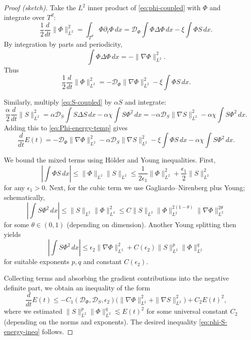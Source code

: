 \documentclass[12pt]{article}
\theoremstyle{plain}
\theoremstyle{definition}
\theoremstyle{remark}
\begin{document}
\begin{proof}[Proof (sketch)]
Take the $L^2$ inner product of \eqref{eq:phi-coupled} with $\Phi$ and integrate
over $T^d$:
\[
    \frac12 \frac{d}{dt}\|\Phi\|_{L^2}^2
    = \int_{T^d} \Phi \partial_t \Phi\,dx
    = \mathcal{D}_\Phi \int \Phi \Delta \Phi\,dx
      - \xi \int \Phi S\,dx.
\]
By integration by parts and periodicity,
\[
    \int \Phi \Delta \Phi\,dx
    = -\|\nabla\Phi\|_{L^2}^2.
\]
Thus
\begin{equation}
    \frac12 \frac{d}{dt}\|\Phi\|_{L^2}^2
    = - \mathcal{D}_\Phi \|\nabla\Phi\|_{L^2}^2
      - \xi \int \Phi S\,dx.
    \label{eq:Phi-energy-temp}
\end{equation}

Similarly, multiply \eqref{eq:S-coupled} by $\alpha S$ and integrate:
\[
    \frac{\alpha}{2} \frac{d}{dt}\|S\|_{L^2}^2
    = \alpha \mathcal{D}_S \int S \Delta S\,dx
      - \alpha\chi \int S \Phi^2\,dx
    = - \alpha \mathcal{D}_S \|\nabla S\|_{L^2}^2
      - \alpha\chi \int S \Phi^2\,dx.
\]
Adding this to \eqref{eq:Phi-energy-temp} gives
\[
    \frac{d}{dt} E(t)
    = - \mathcal{D}_\Phi \|\nabla\Phi\|_{L^2}^2
      - \alpha \mathcal{D}_S \|\nabla S\|_{L^2}^2
      - \xi \int \Phi S\,dx
      - \alpha\chi \int S \Phi^2\,dx.
\]

We bound the mixed terms using Hölder and Young inequalities. First,
\[
    \left| \int \Phi S\,dx \right|
    \le \|\Phi\|_{L^2}\|S\|_{L^2}
    \le \frac{1}{2\epsilon_1}\|\Phi\|_{L^2}^2
         + \frac{\epsilon_1}{2}\|S\|_{L^2}^2
\]
for any $\epsilon_1>0$. Next, for the cubic term we use Gagliardo--Nirenberg
plus Young; schematically,
\[
    \left|\int S \Phi^2\,dx\right|
    \le \|S\|_{L^2}\|\Phi\|_{L^4}^2
    \le C \|S\|_{L^2}
        \|\Phi\|_{L^2}^{2(1-\theta)}
        \|\nabla\Phi\|_{L^2}^{2\theta}
\]
for some $\theta\in(0,1)$ (depending on dimension). Another Young splitting
then yields
\[
    \left|\int S \Phi^2\,dx\right|
    \le \epsilon_2 \|\nabla\Phi\|_{L^2}^2
      + C(\epsilon_2)\|S\|_{L^2}^{p}\|\Phi\|_{L^2}^{q}
\]
for suitable exponents $p,q$ and constant $C(\epsilon_2)$.

Collecting terms and absorbing the gradient contributions into the negative
definite part, we obtain an inequality of the form
\[
    \frac{d}{dt} E(t)
    \le - C_1(\mathcal{D}_\Phi,\mathcal{D}_S,\epsilon_2)\big(
        \|\nabla\Phi\|_{L^2}^2 + \|\nabla S\|_{L^2}^2
    \big)
      + C_2 E(t)^2,
\]
where we estimated $\|S\|_{L^2}^p\|\Phi\|_{L^2}^q \lesssim E(t)^2$ for some
universal constant $C_2$ (depending on the norms and exponents). The desired
inequality \eqref{eq:phi-S-energy-ineq} follows.
\end{proof}
\end{document}
